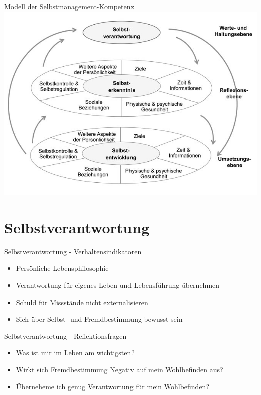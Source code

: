 
\begin{frame}[c]{Modell der Selbstmanagement-Kompetenz}
    \includegraphics[width=\textwidth]{zsm/modell.jpeg}
\end{frame}


\section{Selbstverantwortung}

\begin{frame}[c]{Selbstverantwortung - Verhaltensindikatoren}
    \begin{itemize}
    \item Persönliche Lebensphilosophie
    \pause
    \item Verantwortung für eigenes Leben und Lebensführung übernehmen
    \pause
    \item Schuld für Missstände nicht externalisieren
    \pause
    \item Sich über Selbst- und Fremdbestimmung bewusst sein
    \end{itemize}
\end{frame}


\begin{frame}[c]{Selbstverantwortung - Reflektionsfragen}
    \begin{itemize}
    \item Was ist mir im Leben am wichtigsten? \newline
    \pause
    \item Wirkt sich Fremdbestimmung Negativ auf mein Wohlbefinden aus? \newline
    \pause
    \item Überneheme ich genug Verantwortung für mein Wohlbefinden?
    \end{itemize}
\end{frame}


